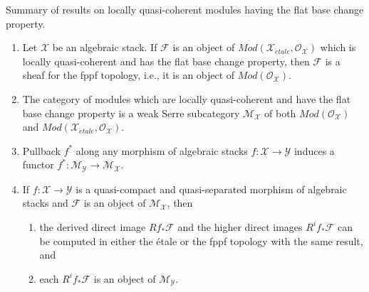 \begin{proposition}
\label{proposition-lcq-flat-base-change}
Summary of results on locally quasi-coherent modules having the flat
base change property.
\begin{enumerate}
\item Let $\mathcal{X}$ be an algebraic stack.
If $\mathcal{F}$ is an object of
$\textit{Mod}(\mathcal{X}_{\acute{e}tale}, \mathcal{O}_\mathcal{X})$
which is locally quasi-coherent and has the flat base change property,
then $\mathcal{F}$ is a sheaf for the fppf topology, i.e., it is
an object of $\textit{Mod}(\mathcal{O}_\mathcal{X})$.
\item The category of modules which are locally quasi-coherent
and have the flat base change property is a weak Serre subcategory
$\mathcal{M}_\mathcal{X}$ of both $\textit{Mod}(\mathcal{O}_\mathcal{X})$
and $\textit{Mod}(\mathcal{X}_{\acute{e}tale}, \mathcal{O}_\mathcal{X})$.
\item Pullback $f^*$ along any morphism of algebraic stacks
$f : \mathcal{X} \to \mathcal{Y}$ induces a functor
$f^* : \mathcal{M}_\mathcal{Y} \to \mathcal{M}_\mathcal{X}$.
\item If $f : \mathcal{X} \to \mathcal{Y}$ is a
quasi-compact and quasi-separated morphism of algebraic stacks
and $\mathcal{F}$ is an object of $\mathcal{M}_\mathcal{X}$, then
\begin{enumerate}
\item the derived direct image $Rf_*\mathcal{F}$ and the higher direct
images $R^if_*\mathcal{F}$ can be computed in either the \'etale or the
fppf topology with the same result, and
\item each $R^if_*\mathcal{F}$ is an object of $\mathcal{M}_\mathcal{Y}$.
\end{enumerate}
\end{enumerate}
\end{proposition}

